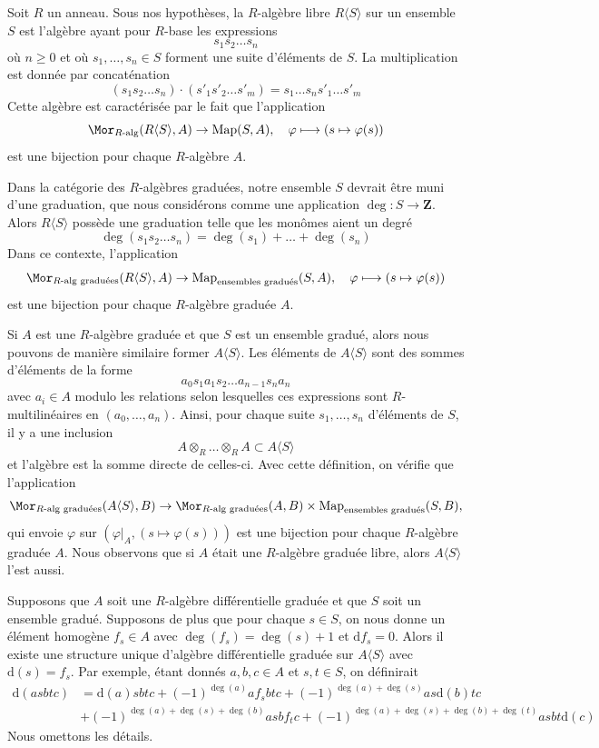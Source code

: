 \noindent
Soit $R$ un anneau. Sous nos hypothèses, la $R$-algèbre libre
$R\langle S \rangle$ sur un ensemble $S$ est l'algèbre ayant pour $R$-base
les expressions
$$
s_1 s_2 \ldots s_n
$$
où $n \geq 0$ et où $s_1, \ldots, s_n \in S$ forment une suite
d'éléments de $S$. La multiplication est donnée par concaténation
$$
(s_1 s_2 \ldots s_n) \cdot (s'_1 s'_2 \ldots s'_m) =
s_1 \ldots s_n s'_1 \ldots s'_m
$$
Cette algèbre est caractérisée par le fait que l'application
$$
\Mor_{R\text{-alg}}(R\langle S \rangle, A) \to
\text{Map}(S, A),\quad
\varphi \longmapsto (s \mapsto \varphi(s))
$$
est une bijection pour chaque $R$-algèbre $A$.

\medskip\noindent
Dans la catégorie des $R$-algèbres graduées, notre ensemble $S$ devrait être
muni d'une graduation, que nous considérons comme une application $\deg : S \to
\mathbf{Z}$. Alors $R\langle S\rangle$ possède une graduation telle que les monômes
aient un degré
$$
\deg(s_1 s_2 \ldots s_n) = \deg(s_1) + \ldots + \deg(s_n)
$$
Dans ce contexte, l'application
$$
\Mor_{\text{}R\text{-alg graduées}}(R\langle S \rangle, A) \to
\text{Map}_{\text{ensembles gradués}}(S,
A),\quad \varphi \longmapsto (s \mapsto \varphi(s))
$$
est une bijection pour chaque $R$-algèbre graduée $A$.

\medskip\noindent
Si $A$ est une $R$-algèbre graduée et que $S$ est un ensemble gradué,
alors nous pouvons de manière similaire former $A\langle S
\rangle$. Les éléments de $A\langle S \rangle$ sont
des sommes d'éléments de la forme
$$
a_0 s_1 a_1 s_2 \ldots a_{n - 1} s_n a_n
$$
avec $a_i \in A$ modulo les relations selon lesquelles ces
expressions sont $R$-multilinéaires en $(a_0, \ldots,
a_n)$. Ainsi, pour chaque suite $s_1, \ldots, s_n$ d'éléments de $S$,
il y a une inclusion
$$
A \otimes_R \ldots \otimes_R A \subset A\langle S \rangle
$$
et l'algèbre est la somme directe de celles-ci. Avec cette définition, on
vérifie que l'application
$$
\Mor_{\text{}R\text{-alg graduées}}(A\langle S \rangle, B) \to
\Mor_{\text{}R\text{-alg graduées}}(A, B) \times
\text{Map}_{\text{ensembles gradués}}(S, B),
$$
qui envoie $\varphi$ sur $(\varphi|_A, (s \mapsto \varphi(s)))$ est
une bijection pour chaque $R$-algèbre graduée $A$. Nous
observons que si $A$ était une $R$-algèbre graduée libre,
alors $A\langle S \rangle$ l'est aussi.

\medskip\noindent
Supposons que $A$ soit une $R$-algèbre différentielle graduée
et que $S$ soit un ensemble gradué. Supposons de plus que pour
chaque $s \in S$, on nous donne un élément homogène $f_s \in A$ avec $\deg(f_s) = \deg(s)
+ 1$ et $\text{d}f_s = 0$. Alors il existe une structure unique
d'algèbre différentielle graduée sur $A\langle S \rangle$ avec
$\text{d}(s) = f_s$. Par exemple, étant donnés $a, b, c \in A$ et
$s, t \in S$, on définirait
\begin{align*}
\text{d}(asbtc)
& =
\text{d}(a)sbtc + (-1)^{\deg(a)}a f_s b t c +
(-1)^{\deg(a) + \deg(s)} as\text{d}(b)tc \\ &
+ (-1)^{\deg(a) + \deg(s) + \deg(b)} asb f_t c +
(-1)^{\deg(a) + \deg(s) + \deg(b) + \deg(t)} asbt\text{d}(c)
\end{align*}
Nous omettons les détails.

